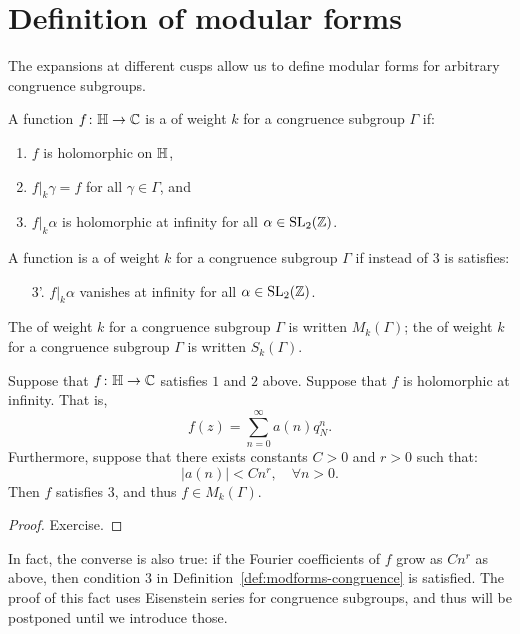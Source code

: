 \section{Definition of modular forms}
The expansions at different cusps allow us to define modular forms for arbitrary congruence subgroups.
\begin{definition}
\label{def:modforms-congruence}
  A function $f\colon\mathbb{H}\to\mathbb{C}$ is a  of weight $k$ for a congruence subgroup $\Gamma$ if:
  \begin{enumerate}
  \item $f$ is holomorphic on $\mathbb{H}$,
  \item $f|_k\gamma = f$ for all $\gamma\in\Gamma$, and
  \item $f|_k\alpha$ is holomorphic at infinity for all $\alpha\in\operatorname{SL}_2(\mathbb{Z})$.
  \end{enumerate}
 A function is a  of weight $k$ for a congruence subgroup $\Gamma$ if instead of $3$ is satisfies:
 \begin{enumerate}[resume]
\item[3'.] $f|_k\alpha$ vanishes at infinity for all $\alpha\in\operatorname{SL}_2(\mathbb{Z})$.
 \end{enumerate}
The  of weight $k$ for a congruence subgroup $\Gamma$ is written $M_k(\Gamma)$; the  of weight $k$ for a congruence subgroup $\Gamma$ is written $S_k(\Gamma)$.
\end{definition}
\begin{proposition}
  Suppose that $f\colon\mathbb{H}\to\mathbb{C}$ satisfies $1$ and $2$ above. Suppose that $f$ is holomorphic at infinity. That is,
\[
f(z) = \sum_{n=0}^\infty a(n)q_N^n.
\]
Furthermore, suppose that there exists constants $C>0$ and $r>0$ such that:
\[
|a(n)|< Cn^r,\quad \forall n > 0.
\]
Then $f$ satisfies $3$, and thus $f\in M_k(\Gamma)$.
\end{proposition}
\begin{proof}
  Exercise.
\end{proof}
\begin{remark}
  In fact, the converse is also true: if the Fourier coefficients of $f$ grow as $Cn^r$ as above, then condition $3$ in Definition~\ref{def:modforms-congruence} is satisfied. The proof of this fact uses Eisenstein series for congruence subgroups, and thus will be postponed until we introduce those.
\end{remark}

